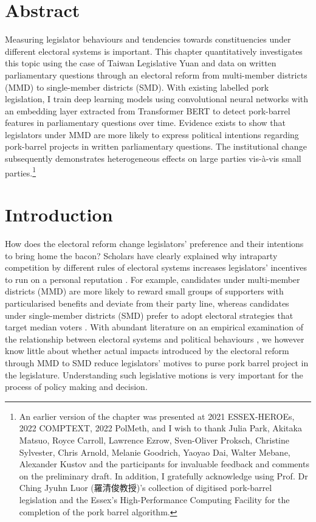 
\section*{\centering Abstract}
\small Measuring legislator behaviours and tendencies towards constituencies under different electoral systems is important. This chapter quantitatively investigates this topic using the case of Taiwan Legislative Yuan and data on written parliamentary questions through an electoral reform from multi-member districts (MMD) to single-member districts (SMD). With existing labelled pork legislation, I train deep learning models using convolutional neural networks with an embedding layer extracted from Transformer BERT to detect pork-barrel features in parliamentary questions over time. Evidence exists to show that legislators under MMD are more likely to express political intentions regarding pork-barrel projects in written parliamentary questions. The institutional change subsequently demonstrates heterogeneous effects on large parties vis-à-vis small parties.\footnote{An earlier version of the chapter was presented at 2021 ESSEX-HEROEs, 2022 COMPTEXT, 2022 PolMeth, and I wish to thank Julia Park, Akitaka Matsuo, Royce Carroll, Lawrence Ezrow, Sven-Oliver Proksch, Christine Sylvester, Chris Arnold, Melanie Goodrich, Yaoyao Dai, Walter Mebane, Alexander Kustov and the participants for invaluable feedback and comments on the preliminary draft. In addition, I gratefully acknowledge using Prof. Dr Ching Jyuhn Luor (羅清俊教授)'s collection of digitised pork-barrel legislation and the Essex's High-Performance Computing Facility for the completion of the pork barrel algorithm.}  

\clearpage

\section*{\centering Introduction}
How does the electoral reform change legislators' preference and their intentions to bring home the bacon? Scholars have clearly explained why intraparty competition by different rules of electoral systems increases legislators' incentives to run on a personal reputation \citep{Cox1990, Downs1957, Carey1995}. For example, candidates under multi-member districts (MMD) are more likely to reward small groups of supporters with particularised benefits and deviate from their party line, whereas candidates under single-member districts (SMD) prefer to adopt electoral strategies that target median voters \citep{Cox1990}. With abundant literature on an empirical examination of the relationship between electoral systems and political behaviours \citep[e.g.][]{Cox1990, Catalinac2016, Catalinac2017, Goplerud2021}, we however know little about whether actual impacts introduced by the electoral reform through MMD to SMD reduce legislators' motives to purse pork barrel project in the legislature. Understanding such legislative motions is very important for the process of policy making and decision. 

